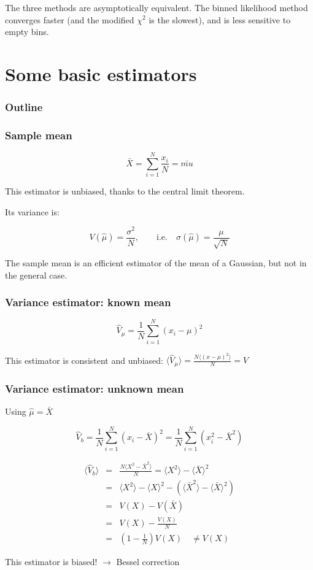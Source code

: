 \documentclass[9pt]{beamer}
\begin{document}
\begin{frame}
 \frametitle{}
 
 The three methods are asymptotically equivalent. The binned likelihood method converges faster (and the modified $\chi^2$ is the slowest), and is less sensitive to empty bins. 
\end{frame}

\section{Some basic estimators}


\begin{frame}
 \frametitle{Outline}
 
 \tableofcontents[current]
\end{frame}

\begin{frame}
 \frametitle{Sample mean}
 
 $$\bar{X} = \sum_{i=1}^N \frac{x_i}{N} = \bar{mu}$$
 
 This estimator is unbiased, thanks to the central limit theorem.
 
 Its variance is:
 
 $$V(\hat{\mu}) = \frac{\sigma^2}{N},\qquad\text{i.e.}\quad \sigma(\hat{\mu}) = \frac{\mu}{\sqrt{N}}$$
 
 The sample mean is an efficient estimator of the mean of a Gaussian, but not in the general case.
\end{frame}

\begin{frame}
 \frametitle{Variance estimator: known mean}
 
 $$\hat{V}_\mu = \frac{1}{N} \sum_{i=1}^N (x_i-\mu)^2$$
 
 This estimator is consistent and unbiased: $\langle \hat{V}_\mu \rangle = \frac{N\langle (x-\mu)^2 \rangle}{N} = V$
\end{frame}

\begin{frame}
 \frametitle{Variance estimator: unknown mean}
 
 Using $\hat{\mu} = \bar{X}$
 
 $$\hat{V}_b = \frac{1}{N} \sum_{i=1}^N (x_i-\bar{X})^2 = \frac{1}{N} \sum_{i=1}^N (x_i^2 - \bar{X}^2)$$
 
 \begin{eqnarray}
  \langle \hat{V}_b \rangle & = & \frac{N \langle X^2 - \bar{X}^2 \rangle}{N} = \langle X^2 \rangle - \langle \bar{X} \rangle^2 \nonumber \\
  & = & \langle X^2 \rangle - \langle X \rangle^2 - \left( \langle \bar{X}^2 \rangle - \langle \bar{X} \rangle ^2 \right) \nonumber \\
  & = & V(X) - V(\bar{X}) \nonumber \\
  & = & V(X) - \frac{V(X)}{N} \nonumber \\
  & = & \left( 1 - \frac{1}{N} \right) V(X)\quad \neq V(X) \nonumber
 \end{eqnarray}
 
 This estimator is biased! $\rightarrow$ Bessel correction

\end{frame}
\end{document}
